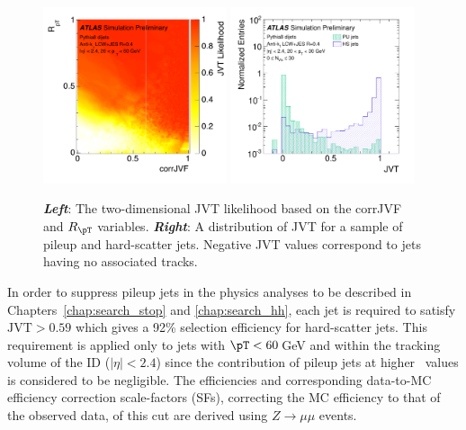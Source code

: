 \begin{figure}[!htb]
    \begin{center}
        \includegraphics[width=0.48\textwidth]{figures/chapter3/jets/jvt_2d}
        \includegraphics[width=0.48\textwidth]{figures/chapter3/jets/jvt_disc}
        \caption{
            \textit{\textbf{Left}}: The two-dimensional JVT likelihood based on the corrJVF and $R_{\pT}$ variables.
            \textit{\textbf{Right}}: A distribution of JVT for a sample of pileup and hard-scatter jets. Negative JVT values
                correspond to jets having no associated tracks.
        }
        \label{fig:jvt_disc}
    \end{center}
\end{figure}

In order to suppress pileup jets in the physics analyses to be described in Chapters~\ref{chap:search_stop} and \ref{chap:search_hh},
each jet is required to satisfy $\text{JVT} > 0.59$ which gives a 92\% selection efficiency for hard-scatter jets.
This requirement is applied only to jets with $\pT<60$\,GeV and within the tracking volume of the ID ($| \eta | < 2.4$)
since the contribution of pileup jets at higher \pT~values is considered to be negligible.
The efficiencies and corresponding data-to-MC efficiency correction scale-factors (SFs), correcting the MC efficiency
to that of the observed data, of this cut are derived using $Z \rightarrow \mu \mu$ events.
